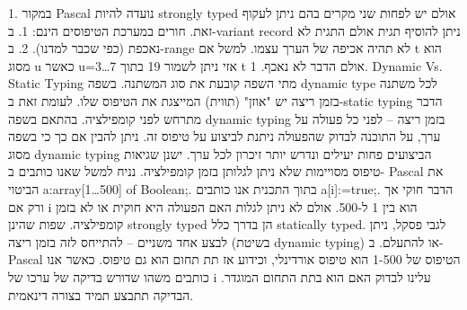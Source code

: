       1. במקור Pascal נועדה להיות strongly typed אולם יש לפחות שני מקרים בהם ניתן לעקוף זאת. חורים במערכת הטיפוסים הינם:
      1. ב-variant record ניתן להוסיף תגית אולם התגית לא נאכפת (כפי שכבר למדנו).
      2. ב-range לא תהיה אכיפה של הערך עצמו. למשל אם t הוא מסוג u כאשר u=3…7 אזי ניתן לשמור 19 בתוך t אולם הדבר לא נאכף.
      1. Dynamic Vs. Static Typing מתי השפה קובעת את סוג המשתנה. בשפה dynamic type לכל משתנה בזמן ריצה יש "אוזן" (תווית) המייצגת את הטיפוס שלו.
      לעומת זאת ב-static typing הדבר מתרחש לפני קומפילציה.
      בהתאם בשפה dynamic typing בזמן ריצה – לפני כל פעולה על ערך, על התוכנה לבדוק שהפעולה ניתנת לביצוע על טיפוס זה.
      ניתן להבין אם כך כי בשפה מסוג dynamic typing הביצועים פחות יעילים ונדרש יותר זיכרון לכל ערך.
      ישנן שגיאות טיפוס מסויימות שלא ניתן לגלותן בזמן קומפילציה. נניח למשל שאנו
      כותבים ב- Pascal את הביטוי a:array[1…500] of Boolean;. בתוך התכנית אנו כותבים
      a[i]:=true;. הדבר חוקי אך ורק אם i הוא בין 1 ל-500. אולם לא ניתן לגלות האם
      הפעולה היא חוקית או לא בזמן קומפילציה. שפות שהינן strongly typed הן בדרך כלל
      statically typed. לגבי פסקל, ניתן לבצע אחד משניים – להתייחס לזה בזמן ריצה
      (בשיטת dynamic typing) או להתעלם. ב- Pascal הטיפוס של 1-500 הוא טיפוס אורדינלי,
      וכידוע אז תת תחום הוא גם טיפוס. כאשר אנו כותבים משהו שדורש בדיקה של ערכו של i
      עלינו לבדוק האם הוא בתת התחום המוגדר. הבדיקה תתבצע תמיד בצורה דינאמית.

